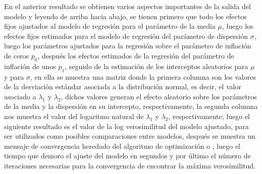 En el anterior resultado se obtienen varios aspectos importantes de la salida del modelo y leyendo de arriba hacia abajo, se tienen primero que todo los efectos fijos ajustados al modelo de regresi\'{o}n para el par\'{a}metro de la media $\mu$, luego los efectos fijos estimados para el modelo de regresi\'{o}n del par\'{a}metro de dispersi\'{o}n $\sigma$, luego los par\'{a}metros ajustados para la regresi\'{o}n sobre el par\'{a}metro de inflaci\'{o}n de ceros $p_0$, despu\'{e}s los efectos estimados de la regresi\'{o}n del par\'{a}metro de inflaci\'{o}n de unos $p_1$, seguido de la estimaci\'{o}n de los interceptos aleatorios para $\mu$ y para $\sigma$, en ella se muestra una matriz donde la primera columna son los valores de la desviaci\'{o}n est\'{a}ndar asociada a la distribuci\'{o}n normal, es decir, el valor asociado a $\lambda_1$ y $\lambda_2$, dichos valores generan el efecto aleatorio sobre los par\'{a}metros de la media y la dispersi\'{o}n en su intercepto, respectivamente, la segunda columna nos muestra el valor del logaritmo natural de $\lambda_1$ y $\lambda_2$, respectivamente; luego el siguiente resultado es el valor de la log verosimilitud del modelo ajustado, para ser utilizados como posibles comparaciones entre modelos, despu\'{e}s se muestra un mensaje de convergencia heredado del algoritmo de optimizaci\'{o}n  o , luego el tiempo que demoro el ajuste del modelo en segundos y por \'{u}ltimo el n\'{u}mero de iteraciones necesarias para la convergencia de encontrar la m\'{a}xima verosimilitud.


